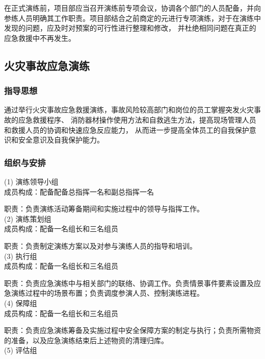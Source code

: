 在正式演练前，项目部应当召开演练前专项会议，协调各个部门的人员配备，并向参练人员明确其工作职责。项目部结合之前商定的元进行专项演练，对于在演练中发现的问题，应及时对预案的可行性进行整理和修改，
并杜绝相同问题在真正的应急救援中不再发生。

\subsection{火灾事故应急演练}
\subsubsection{指导思想}

通过举行火灾事故应急救援演练，事故风险较高部门和岗位的员工掌握突发火灾事故的应急救援程序、
消防器材操作使用方法和自救逃生方法，提高现场管理人员和救援人员的协调和快速应急反应能力，
从而进一步提高全体员工的自我保护意识和安全意识及自我保护能力。

\subsubsection{组织与安排}

(1) 演练领导小组\\

成员构成：配备配备总指挥一名和副总指挥一名

职责：负责演练活动筹备期间和实施过程中的领导与指挥工作。\\

(2) 演练策划组\\

成员构成：配备一名组长和三名组员

职责：负责制定演练方案以及对参与演练人员的指导和培训。\\

(3)	执行组\\

成员构成：配备一名组长和三名组员

职责：负责应急演练中与相关部门的联络、协调工作。负责情景事件要素设置及应急演练过程中的场景布置；负责调度参演人员、控制演练进程。\\

(4) 保障组\\

成员构成：配备一名组长和三名组员

职责：负责应急演练筹备及实施过程中安全保障方案的制定与执行；负责所需物资的准备，以及应急演练结束后上述物资的清理归库。\\

(5) 评估组\\


